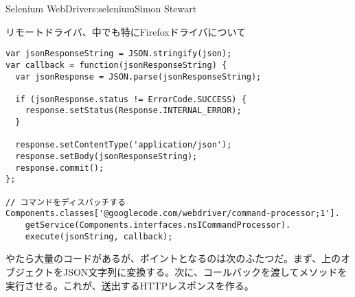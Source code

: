 \begin{aosachapter}{Selenium WebDriver}{s:selenium}{Simon Stewart}
\begin{aosasect1}{リモートドライバ、中でも特にFirefoxドライバについて}


\begin{verbatim}
var jsonResponseString = JSON.stringify(json);
var callback = function(jsonResponseString) {
  var jsonResponse = JSON.parse(jsonResponseString);

  if (jsonResponse.status != ErrorCode.SUCCESS) {
    response.setStatus(Response.INTERNAL_ERROR);
  }

  response.setContentType('application/json');
  response.setBody(jsonResponseString);
  response.commit();
};

// コマンドをディスパッチする
Components.classes['@googlecode.com/webdriver/command-processor;1'].
    getService(Components.interfaces.nsICommandProcessor).
    execute(jsonString, callback);
\end{verbatim}


やたら大量のコードがあるが、ポイントとなるのは次のふたつだ。まず、上のオブジェクトをJSON文字列に変換する。次に、コールバックを渡してメソッドを実行させる。これが、送出するHTTPレスポンスを作る。


\end{aosasect1}
\end{aosachapter}

